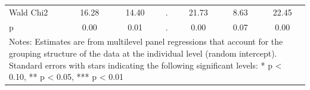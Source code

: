 {\begin{tabular}{l*{6}{c}}
Wald Chi2           &       16.28         &       14.40         &           .         &       21.73         &        8.63         &       22.45         \\
p                   &        0.00         &        0.01         &           .         &        0.00         &        0.07         &        0.00         \\
\bottomrule
\multicolumn{7}{l}{\footnotesize Notes: Estimates are from multilevel panel regressions that account for the grouping structure of the data at the individual level (random intercept). Standard errors with stars indicating the following significant levels: * p < 0.10, ** p < 0.05, *** p < 0.01}\\
\end{tabular}
}
